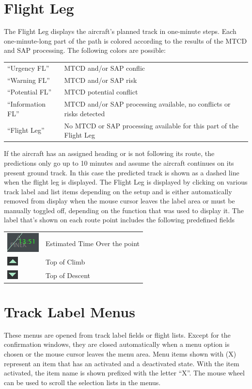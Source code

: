 \documentclass[11pt,a4paper,oldfontcommands]{memoir}
\begin{document}
\section{Flight Leg}
The Flight Leg displays the aircraft’s planned track in one-minute steps. Each one-minute-long part of the
path is colored according to the results of the MTCD and SAP processing. The following colors are possible:
\medskip
\begin{tabular}{p{5cm}p{5cm}}
“Urgency FL”        & MTCD and/or SAP conflic
\\“Warning FL”      & MTCD and/or SAP risk
\\“Potential FL”    & MTCD potential conflict
\\“Information FL”  & MTCD and/or SAP processing available, no conflicts or risks detected
\\“Flight Leg”      & No MTCD or SAP processing available for this part of the Flight Leg
\end{tabular}
\medskip
If the aircraft has an assigned heading or is not following its route, the predictions only go up to 10 minutes
and assume the aircraft continues on its present ground track. In this case the predicted track is shown as a
dashed line when the flight leg is displayed.
\medskip
The Flight Leg is displayed by clicking on various track label and list items depending on the setup and is
either automatically removed from display when the mouse cursor leaves the label area or must be
manually toggled off, depending on the function that was used to display it.
\medskip
The label that’s shown on each route point includes the following predefined fields
\begin{tabular}{p{5cm}p{5cm}}
\includegraphics{img/fleto.png}     & Estimated Time Over the point
\\\includegraphics{img/fltoc.png}   & Top of Climb
\\\includegraphics{img/fltod.png}   & Top of Descent
\end{tabular}

\section{Track Label Menus}
These menus are opened from track label fields or flight lists. Except for the confirmation windows, they
are closed automatically when a menu option is chosen or the mouse cursor leaves the menu area. Menu
items shown with (X) represent an item that has an activated and a deactivated state. With the item
activated, the item name is shown prefixed with the letter “X”. The mouse wheel can be used to scroll the
selection lists in the menus.
\end{document}
